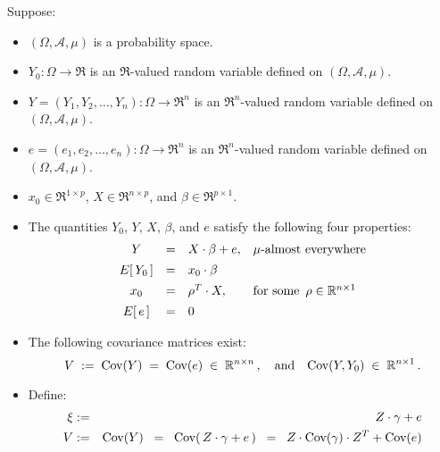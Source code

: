 \begin{theorem}
\label{AMixedModelEquivalentFixedModel}
\mbox{}
\vskip 0.1cm
\noindent
Suppose:
\begin{itemize}
\item
	$(\Omega,\mathcal{A},\mu)$ is a probability space.
\item
	$Y_{0} : \Omega \longrightarrow \Re$ is an $\Re$-valued random variable
	defined on $(\Omega,\mathcal{A},\mu)$.
\item
	$Y = (Y_{1}, Y_{2}, \ldots, Y_{n}) : \Omega \longrightarrow \Re^{n}$ is an $\Re^{n}$-valued random variable
	defined on $(\Omega,\mathcal{A},\mu)$.
\item
	$e = (e_{1}, e_{2}, \ldots, e_{n}) : \Omega \longrightarrow \Re^{n}$ is an $\Re^{n}$-valued random variable
	defined on $(\Omega,\mathcal{A},\mu)$.
\item
	$x_{0} \in \Re^{1 \times p}$, $X \in \Re^{n \times p}$, and $\beta \in \Re^{p \times 1}$.
	\vskip 0.0cm
\item
	The quantities $Y_{0}$, $Y$, $X$, $\beta$, and $e$ satisfy the following four properties:
	\begin{equation*}
	\begin{array}{ccll}
	Y & = & X \cdot \beta + e, & \textnormal{$\mu$-almost everywhere}
	\\
	E\!\left[\,Y_{0}\,\right] &\overset{{\color{white}\vert}}{=}& x_{0} \cdot \beta
	\\
	x_{0} &\overset{{\color{white}\vert}}{=}& \rho^{T} \cdot X, & \textnormal{for some \,$\rho \in \Re^{n \times 1}$}
	\\
	E\!\left[\,e\,\right] &\overset{{\color{white}\vert}}{=}& 0
	\end{array}
	\end{equation*}
\item
	The following covariance matrices exist:
	\begin{equation*}
	V \;:=\; \textnormal{Cov}(Y) \;=\; \textnormal{Cov}(e) \;\in\; \mathbb{R}^{n \times n}\,,
	\quad\textnormal{and}\quad
	\textnormal{Cov}(Y,Y_{0}) \;\in\; \mathbb{R}^{n \times 1}\,.
	\end{equation*}
\item
	Define:
	\begin{eqnarray*}
	\xi & := & Z \cdot \gamma + e
	\\
	V & := & \Cov(Y) \;\; = \;\; \Cov\!\left(\,Z\cdot\gamma+e\,\right) \;\; = \;\; Z \cdot \Cov(\gamma) \cdot Z^{T} + \Cov(e)

\end{eqnarray*}
\end{itemize}
\end{theorem}

